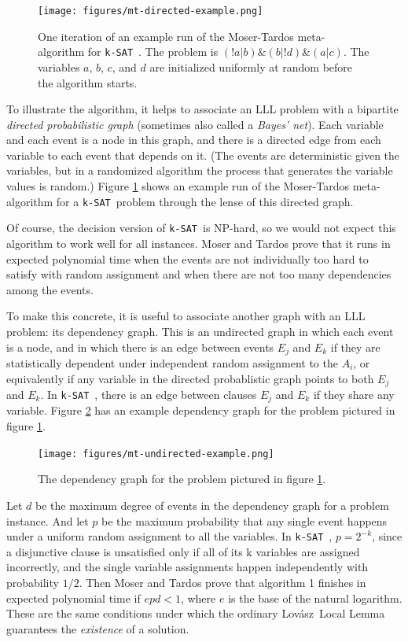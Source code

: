 \documentclass[twocolumn]{article}
\newcommand{\ksat}{\texttt{k-SAT}~}
\newcommand{\lovasz}{Lov\'{a}sz~}
\begin{document}
\begin{figure}[ht]
  \texttt{[image: figures/mt-directed-example.png]}
  \caption{One iteration of an example run of the Moser-Tardos meta-algorithm for \ksat.  The problem is $(!a|b)\&(b|!d)\&(a|c)$.  The variables $a$, $b$, $c$, and $d$ are initialized uniformly at random before the algorithm starts.}
  \label{fig:mt-directed-example}
\end{figure}

To illustrate the algorithm, it helps to associate an LLL problem with a bipartite \emph{directed probabilistic graph} (sometimes also called a \emph{Bayes' net}).  Each variable and each event is a node in this graph, and there is a directed edge from each variable to each event that depends on it.  (The events are deterministic given the variables, but in a randomized algorithm the process that generates the variable values is random.)  Figure \ref{fig:mt-directed-example} shows an example run of the Moser-Tardos meta-algorithm for a \ksat problem through the lense of this directed graph.

Of course, the decision version of \ksat is NP-hard, so we would not expect this algorithm to work well for all instances.  Moser and Tardos \cite{moser2010constructive} prove that it runs in expected polynomial time when the events are not individually too hard to satisfy with random assignment and when there are not too many dependencies among the events.

To make this concrete, it is useful to associate another graph with an LLL problem: its dependency graph.  This is an undirected graph in which each event is a node, and in which there is an edge between events $E_j$ and $E_k$ if they are statistically dependent under independent random assignment to the $A_i$, or equivalently if any variable in the directed probablistic graph points to both $E_j$ and $E_k$.  In \ksat, there is an edge between clauses $E_j$ and $E_k$ if they share any variable.  Figure \ref{fig:mt-undirected-example} has an example dependency graph for the problem pictured in figure \ref{fig:mt-directed-example}.

\begin{figure}[ht]
  \texttt{[image: figures/mt-undirected-example.png]}
  \caption{The dependency graph for the problem pictured in figure \ref{fig:mt-directed-example}.}
  \label{fig:mt-undirected-example}
\end{figure}

Let $d$ be the maximum degree of events in the dependency graph for a problem instance.  And let $p$ be the maximum probability that any single event happens under a uniform random assignment to all the variables.  In \ksat, $p = 2^{-k}$, since a disjunctive clause is unsatisfied only if all of its k variables are assigned incorrectly, and the single variable assignments happen independently with probability $1/2$.  Then Moser and Tardos prove that algorithm 1 finishes in expected polynomial time if $e p d < 1$, where $e$ is the base of the natural logarithm.  These are the same conditions under which the ordinary \lovasz Local Lemma guarantees the \emph{existence} of a solution.
\end{document}
